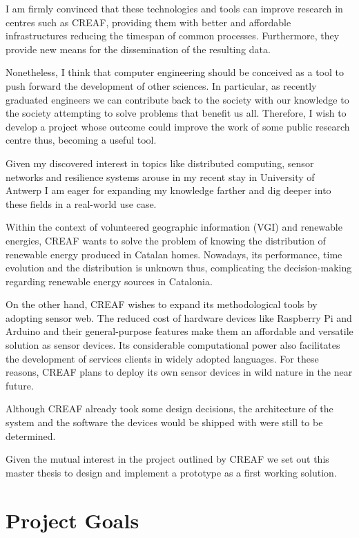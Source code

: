 I am firmly convinced that these technologies and tools can improve research in centres such as CREAF, providing them with better and affordable infrastructures reducing the timespan of common processes. Furthermore, they provide new means for the dissemination of the resulting data.

Nonetheless, I think that computer engineering should be conceived as a tool to push forward the development of other sciences. In particular, as recently graduated engineers we can contribute back to the society with our knowledge to the society attempting to solve problems that benefit us all. Therefore, I wish to develop a project whose outcome could improve the work of some public research centre thus, becoming a useful tool.

Given my discovered interest in topics like distributed computing, sensor networks and resilience systems arouse in my recent stay in University of Antwerp I am eager for expanding my knowledge farther and dig deeper into these fields in a real-world use case.

Within the context of volunteered geographic information (VGI) and renewable energies, CREAF wants to solve the problem of knowing the distribution of renewable energy produced in Catalan homes. Nowadays, its performance, time evolution and the distribution is unknown thus, complicating the decision-making regarding renewable energy sources in Catalonia.

On the other hand, CREAF wishes to expand its methodological tools by adopting sensor web. The reduced cost of hardware devices like Raspberry Pi and Arduino  and their general-purpose features make them an affordable and versatile solution as sensor devices. Its considerable computational power also facilitates the development of services clients in widely adopted languages. For these reasons, CREAF plans to deploy its own sensor devices in wild nature in the near future. 

Although CREAF already took some design decisions, the architecture of the system and the software the devices would be shipped with were still to be determined.

Given the mutual interest in the project outlined by CREAF we set out this master thesis to design and implement a prototype as a first working solution.

\section{Project Goals}

